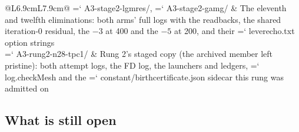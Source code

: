 \documentclass[11pt,a4paper]{article}
\newcommand{\artifact}[1]{{\small\ttfamily\hyphenchar\font=`\-\relax
  \def\_{\textunderscore\allowbreak}#1}}
\begin{document}
\begin{longtable}{@{}L{6.9cm}L{7.9cm}@{}}
\artifact{A3-stage2-lgmres/}, \artifact{A3-stage2-gamg/} & The eleventh and twelfth eliminations: both arms' full logs with the readbacks, the shared iteration-0 residual, the \(-3\) at 400 and the \(-5\) at 200, and their \artifact{lever\_echo.txt} option strings \\
\artifact{A3-rung2-n28-tpc1/} & Rung 2's staged copy (the archived member left pristine): both attempt logs, the FD log, the launchers and ledgers, \artifact{log.checkMesh} and the \artifact{constant/birth\_certificate.json} sidecar this rung was admitted on \\
\bottomrule
\end{longtable}

\subsection{What is still open}
\end{document}
